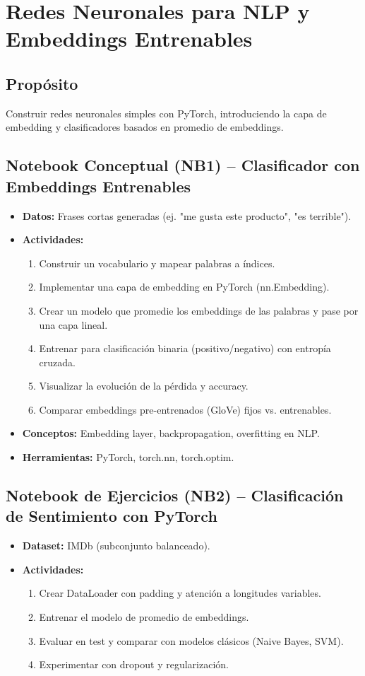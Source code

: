 \documentclass[12pt,a4paper]{article}
\begin{document}
\section{Redes Neuronales para NLP y Embeddings Entrenables}
\subsection*{Propósito}
Construir redes neuronales simples con PyTorch, introduciendo la capa de embedding y clasificadores basados en promedio de embeddings.

\subsection*{Notebook Conceptual (NB1) – Clasificador con Embeddings Entrenables}
\begin{itemize}
    \item \textbf{Datos:} Frases cortas generadas (ej. "me gusta este producto", "es terrible").
    \item \textbf{Actividades:}
    \begin{enumerate}
        \item Construir un vocabulario y mapear palabras a índices.
        \item Implementar una capa de embedding en PyTorch (nn.Embedding).
        \item Crear un modelo que promedie los embeddings de las palabras y pase por una capa lineal.
        \item Entrenar para clasificación binaria (positivo/negativo) con entropía cruzada.
        \item Visualizar la evolución de la pérdida y accuracy.
        \item Comparar embeddings pre-entrenados (GloVe) fijos vs. entrenables.
    \end{enumerate}
    \item \textbf{Conceptos:} Embedding layer, backpropagation, overfitting en NLP.
    \item \textbf{Herramientas:} PyTorch, torch.nn, torch.optim.
\end{itemize}

\subsection*{Notebook de Ejercicios (NB2) – Clasificación de Sentimiento con PyTorch}
\begin{itemize}
    \item \textbf{Dataset:} IMDb (subconjunto balanceado).
    \item \textbf{Actividades:}
    \begin{enumerate}
        \item Crear DataLoader con padding y atención a longitudes variables.
        \item Entrenar el modelo de promedio de embeddings.
        \item Evaluar en test y comparar con modelos clásicos (Naive Bayes, SVM).
        \item Experimentar con dropout y regularización.
    \end{enumerate}
\end{itemize}
\end{document}
